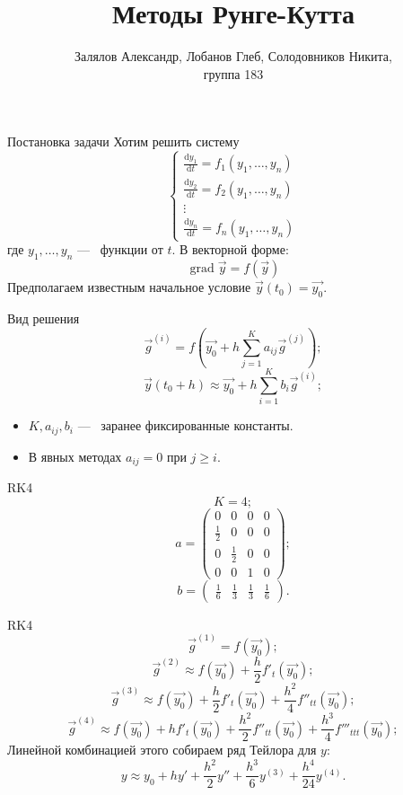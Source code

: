 \documentclass{beamer}
\title{Методы Рунге-Кутта}
\author{Залялов Александр, Лобанов Глеб, Солодовников Никита, \\ группа 183}
\date{}
\newcommand{\diff}{\mathrm{d}}
\DeclareMathOperator{\grad}{grad}
\begin{document}
\begin{frame}
	\titlepage
\end{frame}

\begin{frame}{Постановка задачи}
	Хотим решить систему
	\[ \begin{cases} 
		\frac{\diff y_1}{\diff t} = f_1(y_1, \ldots, y_n) \\
		\frac{\diff y_2}{\diff t} = f_2(y_1, \ldots, y_n) \\
		\vdots \\
		\frac{\diff y_n}{\diff t} = f_n(y_1, \ldots, y_n)
	\end{cases} \]
	где $y_1, \ldots, y_n$ ---~ функции от $t$. В векторной форме:
	\[\grad \vec{y} = f(\vec{y}) \]
	Предполагаем известным начальное условие $\vec{y}(t_0) = \vec{y_0}$.
\end{frame}

\begin{frame}{Вид решения}
	\[\vec{g}^{(i)} = f\left(\vec{y_0} + h\sum_{j = 1}^K a_{ij}\vec{g}^{(j)}\right); \]
	\[\vec{y}(t_0 + h) \approx \vec{y_0} + h\sum_{i = 1}^K b_i \vec{g}^{(i)};  \]

	\begin{itemize}
		\item<1-> $K, a_{ij}, b_i$ ---~ заранее фиксированные константы.
		\item<2-> В явных методах $a_{ij} = 0$ при $j \ge i$.
	\end{itemize}
\end{frame}

\begin{frame}{RK4}
	\[ K = 4; \]
	\[ a = \begin{pmatrix} 
		0 & 0 & 0 & 0 \\
		\frac{1}{2} & 0 & 0 & 0 \\
		0 & \frac{1}{2} & 0 & 0 \\
		0 & 0 & 1 & 0
		\end{pmatrix}; \]
	\[ b = \begin{pmatrix} \frac{1}{6} & \frac{1}{3} & \frac{1}{3} & \frac{1}{6} \end{pmatrix}. \]
\end{frame}

\begin{frame}{RK4}
	\[ \vec{g}^{(1)} = f(\vec{y_0}); \]
	\[ \vec{g}^{(2)} \approx f(\vec{y_0}) + \frac{h}{2}f'_t(\vec{y_0}); \]
	\[ \vec{g}^{(3)} \approx f(\vec{y_0}) + \frac{h}{2}f'_t(\vec{y_0}) + \frac{h^2}{4}f''_{tt}(\vec{y_0}); \]
	\[ \vec{g}^{(4)} \approx f(\vec{y_0}) + hf'_t(\vec{y_0}) + \frac{h^2}{2}f''_{tt}(\vec{y_0}) + \frac{h^3}{4}f'''_{ttt}(\vec{y_0});\]
	\pause Линейной комбинацией этого собираем ряд Тейлора для $y$:
	\[y \approx y_0 + hy' + \frac{h^2}{2}y'' + \frac{h^3}{6}y^{(3)} + \frac{h^4}{24}y^{(4)}. \]

\end{frame}
\end{document}

